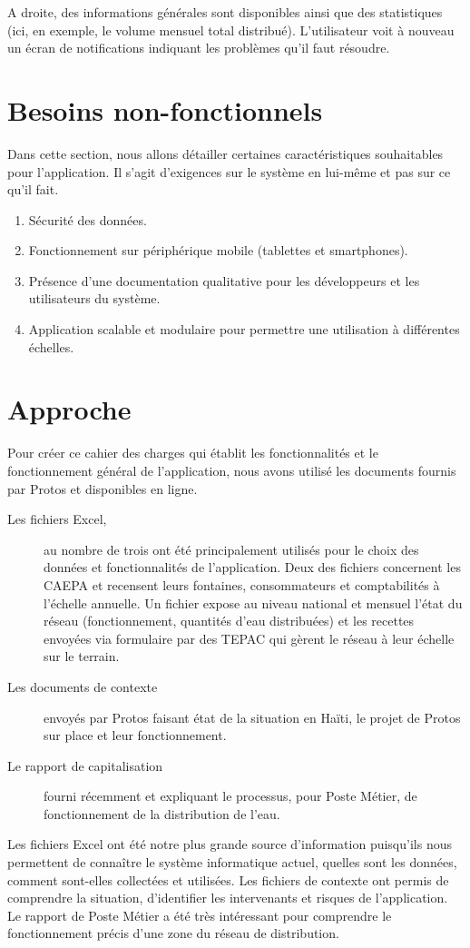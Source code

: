 \documentclass[a4paper, 11pt]{article}
\begin{document}
    A droite, des informations générales sont disponibles ainsi que des statistiques (ici, en exemple, le volume mensuel total distribué).
    L'utilisateur voit à nouveau un écran de notifications indiquant les problèmes qu'il faut résoudre.

\section{Besoins non-fonctionnels}
Dans cette section, nous allons détailler certaines caractéristiques souhaitables pour l'application. Il s'agit d'exigences sur le système en lui-même et pas sur ce qu'il fait.
\begin{enumerate}
  \item Sécurité des données.
  \item Fonctionnement sur périphérique mobile (tablettes et smartphones).
  \item Présence d'une documentation qualitative pour les développeurs et les utilisateurs du système.
  \item Application scalable et modulaire pour permettre une utilisation à différentes échelles.
\end{enumerate}
\section{Approche \label{sec:approach}}
  Pour créer ce cahier des charges qui établit les fonctionnalités et le fonctionnement général de l'application, nous avons utilisé les documents fournis par Protos et disponibles en ligne.
  \begin{description}
    \item[Les fichiers Excel,] au nombre de trois ont été principalement utilisés pour le choix des données et fonctionnalités de l'application. Deux des fichiers concernent les CAEPA et recensent leurs fontaines, consommateurs et comptabilités à l'échelle annuelle. Un fichier expose au niveau national et mensuel l'état du réseau (fonctionnement, quantités d'eau distribuées) et les recettes envoyées via formulaire par des TEPAC qui gèrent le réseau à leur échelle sur le terrain.
    \item[Les documents de contexte] envoyés par Protos faisant état de la situation en Haïti, le projet de Protos sur place et leur fonctionnement.
    \item[Le rapport de capitalisation] fourni récemment et expliquant le processus, pour Poste Métier, de fonctionnement de la distribution de l'eau.
  \end{description}
  Les fichiers Excel ont été notre plus grande source d'information puisqu'ils nous permettent de connaître le système informatique actuel, quelles sont les données, comment sont-elles collectées et utilisées.
  Les fichiers de contexte ont permis de comprendre la situation, d'identifier les intervenants et risques de l'application.
  Le rapport de Poste Métier a été très intéressant pour comprendre le fonctionnement précis d'une zone du réseau de distribution.
\end{document}
